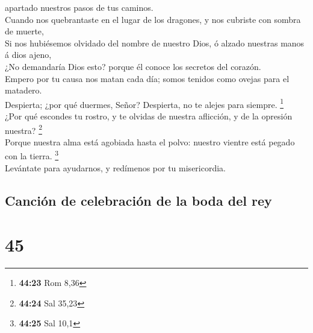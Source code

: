 apartado nuestros pasos de tus caminos.\\
 Cuando nos quebrantaste en el lugar de los dragones, y nos
cubriste con sombra de muerte,\\
 Si nos hubiésemos olvidado del nombre de nuestro Dios, ó
alzado nuestras manos á dios ajeno,\\
 ¿No demandaría Dios esto? porque él conoce los secretos
del corazón.\\
 Empero por tu causa nos matan cada día; somos tenidos como
ovejas para el matadero.\\
 Despierta; ¿por qué duermes, Señor? Despierta, no te
alejes para siempre. \footnote{\textbf{44:23} Rom 8,36}\\
 ¿Por qué escondes tu rostro, y te olvidas de nuestra
aflicción, y de la opresión nuestra? \footnote{\textbf{44:24} Sal 35,23}\\
 Porque nuestra alma está agobiada hasta el polvo: nuestro
vientre está pegado con la tierra. \footnote{\textbf{44:25} Sal 10,1}\\
 Levántate para ayudarnos, y redímenos por tu misericordia.

\hypertarget{canciuxf3n-de-celebraciuxf3n-de-la-boda-del-rey}{%
\subsection{Canción de celebración de la boda del
rey}\label{canciuxf3n-de-celebraciuxf3n-de-la-boda-del-rey}}

\hypertarget{section-44}{%
\section{45}\label{section-44}}

